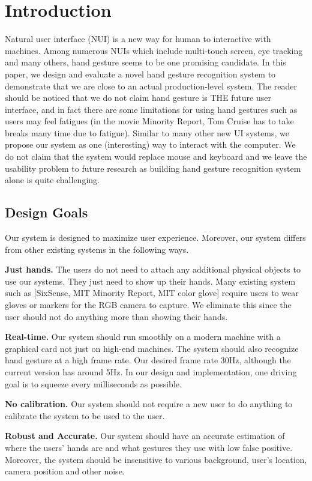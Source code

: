 \section{Introduction}
Natural user interface (NUI) is a new way for human to interactive with machines. Among numerous NUIs which include multi-touch screen, eye tracking and many others, hand gesture seems to be one promising candidate. In this paper, we design and evaluate a novel hand gesture recognition system to demonstrate that we are close to an actual production-level system. The reader should be noticed that we do not claim hand gesture is THE future user interface, and in fact there are some limitations for using hand gestures such as users may feel fatigues (in the movie Minority Report, Tom Cruise has to take breaks many time due to fatigue). Similar to many other new UI systems, we propose our system as one (interesting) way to interact with the computer. We do not claim that the system would replace mouse and keyboard and we leave the usability problem to future research as building hand gesture recognition system alone is quite challenging. 


\subsection{Design Goals}
Our system is designed to maximize user experience. Moreover, our system differs from other existing systems in the following ways.

\textbf{Just hands.} The users do not need to attach any additional physical objects to use our systems. They just need to show up their hands. Many existing system such as [SixSense, MIT Minority Report, MIT color glove] require users to wear gloves or markers  for the RGB camera to capture. We eliminate this since the user should not do anything more than showing their hands. 
  
\textbf{Real-time.} Our system should run smoothly on a modern machine with a graphical card not just on high-end machines. The system should also recognize hand gesture at a high frame rate. Our desired frame rate 30Hz, although the current version has around 5Hz. In our design and implementation, one driving goal is to squeeze every milliseconds as possible. 

\textbf{No calibration.} Our system should not require a new user to do anything to calibrate the system to be used to the user. 

\textbf{Robust and Accurate.} Our system should have an accurate estimation of where the users' hands are and what gestures they use with low false positive. Moreover, the system should be insensitive to various background, user's location, camera position and other noise. 
  
